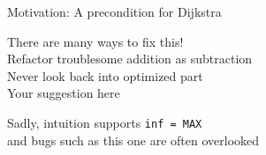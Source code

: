 \documentclass[usenames, xcolor=dvipsnames]{beamer}
\begin{document}
\begin{frame}{Motivation: A precondition for Dijkstra}

There are many ways to fix this!
\\ \hspace{1em} Refactor troublesome addition as subtraction
\\ \hspace{1em} Never look back into optimized part
\\ \hspace{1em} Your suggestion here

\bigskip

\pause Sadly, intuition supports \texttt{inf = MAX} \\
and bugs such as this one are often overlooked

\end{frame}
\end{document}

